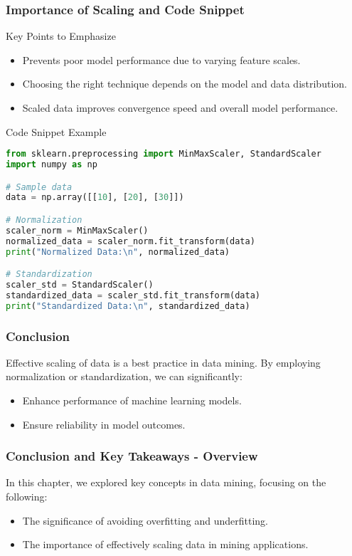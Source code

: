 \documentclass[aspectratio=169]{beamer}
\begin{document}
\begin{frame}[fragile]
  \frametitle{Importance of Scaling and Code Snippet}
  
  \begin{block}{Key Points to Emphasize}
    \begin{itemize}
        \item Prevents poor model performance due to varying feature scales.
        \item Choosing the right technique depends on the model and data distribution.
        \item Scaled data improves convergence speed and overall model performance.
    \end{itemize}
  \end{block}
  
  \begin{block}{Code Snippet Example}
    \begin{lstlisting}[language=Python]
from sklearn.preprocessing import MinMaxScaler, StandardScaler
import numpy as np

# Sample data
data = np.array([[10], [20], [30]])

# Normalization
scaler_norm = MinMaxScaler()
normalized_data = scaler_norm.fit_transform(data)
print("Normalized Data:\n", normalized_data)

# Standardization
scaler_std = StandardScaler()
standardized_data = scaler_std.fit_transform(data)
print("Standardized Data:\n", standardized_data)
    \end{lstlisting}
  \end{block}
\end{frame}

\begin{frame}[fragile]
  \frametitle{Conclusion}
  
  Effective scaling of data is a best practice in data mining. By employing normalization or standardization, we can significantly:
  \begin{itemize}
      \item Enhance performance of machine learning models.
      \item Ensure reliability in model outcomes. 
  \end{itemize}
\end{frame}

\begin{frame}[fragile]
    \frametitle{Conclusion and Key Takeaways - Overview}
    
    In this chapter, we explored key concepts in data mining, focusing on the following:
    
    \begin{itemize}
        \item The significance of avoiding overfitting and underfitting.
        \item The importance of effectively scaling data in mining applications.
    \end{itemize}
\end{frame}
\end{document}
